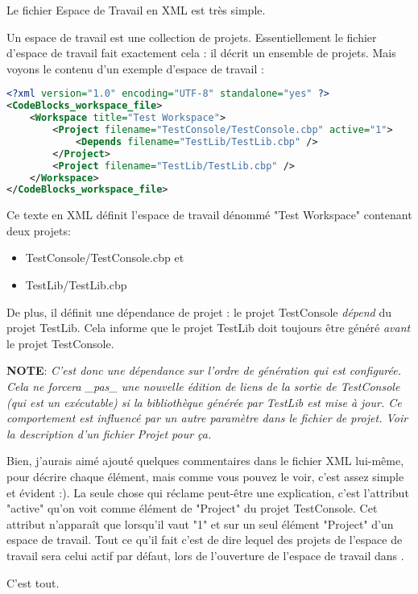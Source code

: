 Le fichier Espace de Travail en XML est très simple.

Un espace de travail est une collection de projets. Essentiellement le fichier d'espace de travail fait exactement cela : il décrit un ensemble de projets. Mais voyons le contenu d'un exemple d'espace de travail :

\begin{lstlisting}[language=XML]
<?xml version="1.0" encoding="UTF-8" standalone="yes" ?>
<CodeBlocks_workspace_file>
	<Workspace title="Test Workspace">
		<Project filename="TestConsole/TestConsole.cbp" active="1">
			<Depends filename="TestLib/TestLib.cbp" />
		</Project>
		<Project filename="TestLib/TestLib.cbp" />
	</Workspace>
</CodeBlocks_workspace_file>
\end{lstlisting}

Ce texte en XML définit l'espace de travail dénommé "Test Workspace" contenant deux projets:

\begin{itemize}
\item TestConsole/TestConsole.cbp et
\item TestLib/TestLib.cbp
\end{itemize}

De plus, il définit une dépendance de projet : le projet TestConsole \textit{dépend} du projet TestLib. Cela informe \codeblocks que le projet TestLib doit toujours être généré \textit{avant} le projet TestConsole.

\textbf{NOTE}: \textit{C'est donc une dépendance sur l'ordre de génération qui est configurée. Cela ne forcera \_pas\_ une nouvelle édition de liens de la sortie de TestConsole (qui est un exécutable) si la bibliothèque générée par TestLib est mise à jour. Ce comportement est influencé par un autre paramètre dans le fichier de projet. Voir la description d'un fichier Projet pour ça.}

Bien, j'aurais aimé ajouté quelques commentaires dans le fichier XML lui-même, pour décrire chaque élément, mais comme vous pouvez le voir, c'est assez simple et évident :). La seule chose qui réclame peut-être une explication, c'est l'attribut "active" qu'on voit comme élément de "Project" du projet TestConsole. Cet attribut n'apparaît que lorsqu'il vaut "1" et sur un seul élément "Project" d'un espace de travail. Tout ce qu'il fait c'est de dire lequel des projets de l'espace de travail sera celui actif par défaut, lors de l'ouverture de l'espace de travail dans \codeblocks.


C'est tout. 